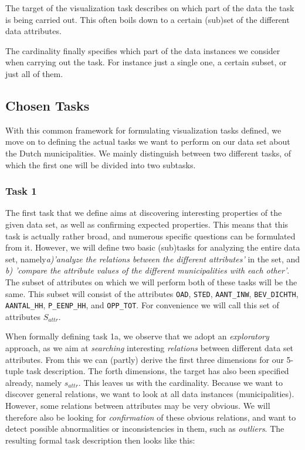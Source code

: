 The target of the visualization task describes on which part of the data the task is being carried out. This often boils down to a certain (sub)set of the different data attributes.

The cardinality finally specifies which part of the data instances we consider when carrying out the task. For instance just a single one, a certain subset, or just all of them.


\subsection{Chosen Tasks}
With this common framework for formulating visualization tasks defined, we move on to defining the actual tasks we want to perform on our data set about the Dutch municipalities. We mainly distinguish between two different tasks, of which the first one will be divided into two subtasks.

\subsubsection{Task 1}\label{sec:task1}
The first task that we define aims at discovering interesting properties of the given data set, as well as confirming expected properties. This means that this task is actually rather broad, and numerous specific questions can be formulated from it. However, we will define two basic (sub)tasks for analyzing the entire data set, namely\textit{a)'analyze the relations between the different attributes'} in the set, and \textit{b) 'compare the attribute values of the different municipalities with each other'}. The subset of attributes on which we will perform both of these tasks will be the same. This subset will consist of the attributes \texttt{OAD}, \texttt{STED}, \texttt{AANT\_INW}, \texttt{BEV\_DICHTH}, \texttt{AANTAL\_HH}, \texttt{P\_EENP\_HH}, and \texttt{OPP\_TOT}. For convenience we will call this set of attributes $S_{attr}$.

When formally defining task 1a, we observe that we adopt an \textit{exploratory} approach, as we aim at \textit{searching} interesting \textit{relations} between different data set attributes. From this we can (partly) derive the first three dimensions for our 5-tuple task description. The forth dimensions, the target has also been specified already, namely $s_{attr}$. This leaves us with the cardinality. Because we want to discover general relations, we want to look at all data instances (municipalities). However, some relations between attributes may be very obvious. We will therefore also be looking for \textit{confirmation} of these obvious relations, and want to detect possible abnormalities or inconsistencies in them, such as \textit{outliers}. The resulting formal task description then looks like this:


